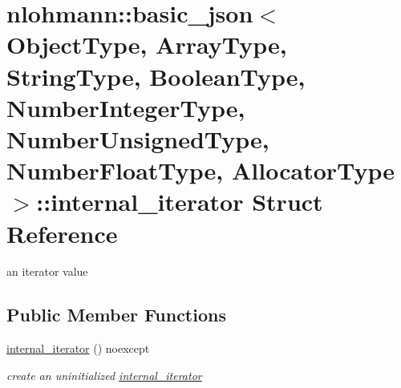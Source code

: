 \hypertarget{structnlohmann_1_1basic__json_1_1internal__iterator}{}\section{nlohmann\+:\+:basic\+\_\+json$<$ Object\+Type, Array\+Type, String\+Type, Boolean\+Type, Number\+Integer\+Type, Number\+Unsigned\+Type, Number\+Float\+Type, Allocator\+Type $>$\+:\+:internal\+\_\+iterator Struct Reference}
\label{structnlohmann_1_1basic__json_1_1internal__iterator}


an iterator value  


\subsection*{Public Member Functions}
\begin{DoxyCompactItemize}
\item 
\hypertarget{structnlohmann_1_1basic__json_1_1internal__iterator_af7975e4fd91cdfc156e81df7c3c40b2b}{}\label{structnlohmann_1_1basic__json_1_1internal__iterator_af7975e4fd91cdfc156e81df7c3c40b2b} 
\hyperlink{structnlohmann_1_1basic__json_1_1internal__iterator_af7975e4fd91cdfc156e81df7c3c40b2b}{internal\+\_\+iterator} () noexcept
\begin{DoxyCompactList}\small\item\em create an uninitialized \hyperlink{structnlohmann_1_1basic__json_1_1internal__iterator}{internal\+\_\+iterator} \end{DoxyCompactList}\end{DoxyCompactItemize}

